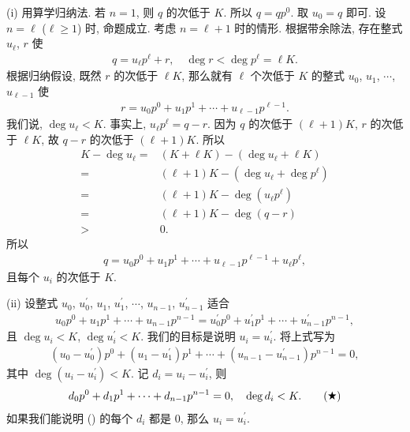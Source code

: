 \begin{pf}
    (i) 用算学归纳法. 若 $n = 1$, 则 $q$ 的次低于 $K$. 所以 $q = q p^0$. 取 $u_0 = q$ 即可. 设 $n = \ell$ ($\ell \geq 1$) 时, 命题成立. 考虑 $n = \ell + 1$ 时的情形. 根据带余除法, 存在整式 $u_\ell$, $r$ 使
    \begin{align*}
        q = u_\ell p^\ell + r, \quad \deg r < \deg p^\ell = \ell K.
    \end{align*}
    根据归纳假设, 既然 $r$ 的次低于 $\ell K$, 那么就有 $\ell$ 个次低于 $K$ 的整式 $u_0$, $u_1$, $\cdots$, $u_{\ell - 1}$ 使
    \begin{align*}
        r = u_0 p^0 + u_1 p^1 + \cdots + u_{\ell - 1} p^{\ell - 1}.
    \end{align*}
    我们说, $\deg u_\ell < K$. 事实上, $u_\ell p^\ell = q - r$. 因为 $q$ 的次低于 $(\ell + 1)K$, $r$ 的次低于 $\ell K$, 故 $q - r$ 的次低于 $(\ell + 1)K$. 所以
    \begin{align*}
        K - \deg u_\ell
        = {} & (K + \ell K) - (\deg u_\ell + \ell K)     \\
        = {} & (\ell + 1)K - (\deg u_\ell + \deg p^\ell) \\
        = {} & (\ell + 1)K - \deg {(u_\ell p^\ell)}      \\
        = {} & (\ell + 1)K - \deg {(q - r)}              \\
        > {} & 0.
    \end{align*}
    所以
    \begin{align*}
        q = u_0 p^0 + u_1 p^1 + \cdots + u_{\ell - 1} p^{\ell - 1} + u_\ell p^\ell,
    \end{align*}
    且每个 $u_i$ 的次低于 $K$.

    (ii) 设整式 $u_0$, $u_0^{\prime}$, $u_1$, $u_1^{\prime}$, $\cdots$, $u_{n-1}$, $u_{n-1}^{\prime}$ 适合
    \begin{align*}
        u_0 p^0 + u_1 p^1 + \cdots + u_{n-1} p^{n-1} = u_0^{\prime} p^0 + u_1^{\prime} p^1 + \cdots + u_{n-1}^{\prime} p^{n-1},
    \end{align*}
    且 $\deg u_i < K$, $\deg u_i^{\prime} < K$. 我们的目标是说明 $u_i = u_i^{\prime}$. 将上式写为
    \begin{align*}
        (u_0 - u_0^{\prime}) p^0 + (u_1 - u_1^{\prime}) p^1 + \cdots + (u_{n-1} - u_{n-1}^{\prime}) p^{n-1} = 0,
    \end{align*}
    其中 $\deg {(u_i - u_i^{\prime})} < K$. 记 $d_i = u_i - u_i^{\prime}$, 则
    \begin{align*}
        d_0 p^0 + d_1 p^1 + \cdots + d_{n-1} p^{n-1} = 0, \quad \deg d_i < K. \tag*{(\ding{72})}
    \end{align*}
    如果我们能说明 () 的每个 $d_i$ 都是 $0$, 那么 $u_i = u_i^{\prime}$.


\end{pf}
